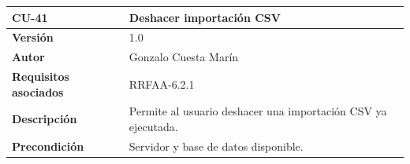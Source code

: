 \documentclass[
]{article}
\begin{document}
\begin{longtable}[]{@{}ll@{}}
\toprule
\begin{minipage}[b]{0.16\columnwidth}\raggedright
\textbf{CU-41}\strut
\end{minipage} & \begin{minipage}[b]{0.78\columnwidth}\raggedright
\textbf{Deshacer importación CSV}\strut
\end{minipage}\tabularnewline
\midrule
\endhead
\begin{minipage}[t]{0.16\columnwidth}\raggedright
\textbf{Versión}\strut
\end{minipage} & \begin{minipage}[t]{0.78\columnwidth}\raggedright
1.0\strut
\end{minipage}\tabularnewline
\begin{minipage}[t]{0.16\columnwidth}\raggedright
\textbf{Autor}\strut
\end{minipage} & \begin{minipage}[t]{0.78\columnwidth}\raggedright
Gonzalo Cuesta Marín\strut
\end{minipage}\tabularnewline
\begin{minipage}[t]{0.16\columnwidth}\raggedright
\textbf{Requisitos asociados}\strut
\end{minipage} & \begin{minipage}[t]{0.78\columnwidth}\raggedright
RRFAA-6.2.1\strut
\end{minipage}\tabularnewline
\begin{minipage}[t]{0.16\columnwidth}\raggedright
\textbf{Descripción}\strut
\end{minipage} & \begin{minipage}[t]{0.78\columnwidth}\raggedright
Permite al usuario deshacer una importación CSV ya ejecutada.\strut
\end{minipage}\tabularnewline
\begin{minipage}[t]{0.16\columnwidth}\raggedright
\textbf{Precondición}\strut
\end{minipage} & \begin{minipage}[t]{0.78\columnwidth}\raggedright
Servidor y base de datos disponible.


\end{minipage}
\end{longtable}
\end{document}
